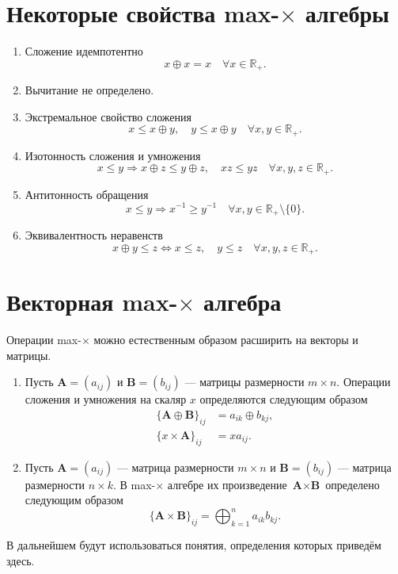 \documentclass[specialist,
	substylefile = spbu.rtx,
	subf,href,colorlinks=true, 12pt]{disser}
\begin{document}
\section{Некоторые свойства max-$\times$ алгебры}
\begin{enumerate}
	\item Сложение идемпотентно
	\[
	x \oplus x = x \quad \forall x \in \mathbb{R}_+.
	\]
	\item Вычитание не определено.
	\item Экстремальное свойство сложения
	\[
	x \leq x \oplus y,\quad y \leq x \oplus y \quad \forall x, y \in \mathbb{R}_+.
	\]
	\item Изотонность сложения и умножения
	\[
	x \leq y \Rightarrow x \oplus z \leq y \oplus z,\quad xz \leq yz \quad \forall x,y,z \in \mathbb{R}_+.
	\]
	\item Антитонность обращения
	\[
	x \leq y \Rightarrow x^{-1} \geq y^{-1} \quad\forall x,y \in \mathbb{R}_+ \setminus \{0\}.
	\]
	\item Эквивалентность неравенств
	\[
	x \oplus y \leq z \Leftrightarrow x \leq z,\quad y \leq z \quad \forall x,y,z \in \mathbb{R}_+.
	\]
\end{enumerate}
\section{Векторная max-$\times$ алгебра}
Операции max-$\times$ можно естественным образом расширить на векторы и матрицы.

\begin{enumerate}
	\item Пусть $\textbf{A} = (a_{ij})$ и $\textbf{B} = (b_{ij})$ --- матрицы размерности $m \times n$. Операции сложения и умножения на скаляр $x$ определяются следующим образом
	\begin{align*}
		\{\textbf{A}\oplus\textbf{B}\}_{ij} &= a_{ik} \oplus b_{kj}, \\
		\{x\times\textbf{A}\}_{ij} &= xa_{ij}.
	\end{align*}
	\item Пусть $\textbf{A} = (a_{ij})$ --- матрица размерности $m \times n$ и $\textbf{B} = (b_{ij})$ --- матрица размерности $n \times k$. В max-$\times$ алгебре их произведение $\textbf{A}\times\textbf{B}$ определено следующим образом
	\[
	  \{\textbf{A}\times\textbf{B}\}_{ij} = \bigoplus_{k=1}^n a_{ik}b_{kj}.
	\]
\end{enumerate}

В дальнейшем будут использоваться понятия, определения которых приведём здесь.
\end{document}
